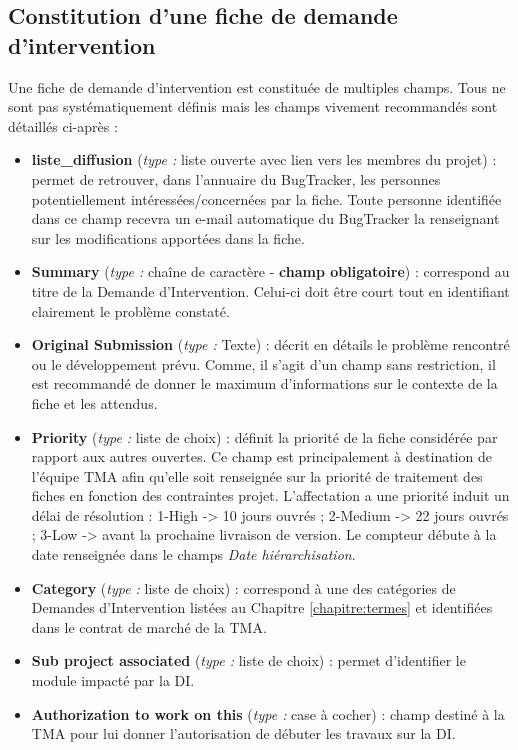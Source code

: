 \subsection{\label{subsec: ficheDI}Constitution d'une fiche de demande d'intervention}
Une fiche de demande d'intervention est constituée de multiples champs. Tous ne sont pas syst\'ematiquement d\'efinis mais les champs vivement recommandés sont détaillés ci-après :\\
\begin{itemize}[label=$\Rightarrow$, font=\LARGE]
   \item \textbf{liste\_diffusion} (\textit{type :} liste ouverte avec lien vers les membres du projet) : permet de retrouver, dans l'annuaire du BugTracker, les personnes potentiellement intéressées/concernées par la fiche. Toute personne identifiée dans ce champ recevra un e-mail automatique du BugTracker la renseignant sur les modifications apportées dans la fiche.
   \item \textbf{Summary} (\textit{type :} chaîne de caractère - \textbf{champ obligatoire}) : correspond au titre de la Demande d'Intervention. Celui-ci doit être court tout en identifiant clairement le problème constaté.  
   \item \textbf{Original Submission} (\textit{type :} Texte) : décrit en détails le problème rencontré ou le développement prévu. Comme, il s'agit d'un champ sans restriction, il est recommandé de donner le maximum d'informations sur le contexte de la fiche et les attendus.
   \item \textbf{Priority} (\textit{type :} liste de choix) : définit la priorité de la fiche considérée par rapport aux autres ouvertes. Ce champ est principalement à destination de l'équipe TMA afin qu'elle soit renseignée sur la priorité de traitement des fiches en fonction des contraintes projet. L'affectation a une priorité induit un délai de résolution : 1-High -> 10 jours ouvrés ; 2-Medium -> 22 jours ouvrés ; 3-Low -> avant la prochaine livraison de version. Le compteur débute à la date renseignée dans le champs \textit{Date hiérarchisation}.
   \item \textbf{Category} (\textit{type :} liste de choix) : correspond à une des catégories de Demandes d'Intervention listées au Chapitre \ref{chapitre:termes} et identifiées dans le contrat de marché de la TMA.
   \item \textbf{Sub project associated} (\textit{type :} liste de choix) : permet d'identifier le module impacté par la DI.
   \item \textbf{Authorization to work on this} (\textit{type :} case à cocher) : champ destiné à la TMA pour lui donner l'autorisation de débuter les travaux sur la DI.

\end{itemize}
